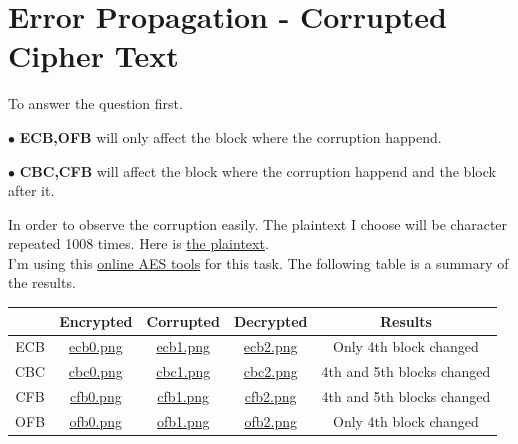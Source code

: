\documentclass{article}
\begin{document}
\section{Error Propagation - Corrupted Cipher Text}
To answer the question first.
\begin{tlist}{2}
	\item[$\bullet$]\textbf{ECB,OFB} will only affect the block where the corruption happend.
	\item[$\bullet$]\textbf{CBC,CFB} will affect the block where the corruption happend and the block after it.
\end{tlist}
In order to observe the corruption easily. The plaintext I choose will be character  repeated 1008 times. Here is
\href{https://i.loli.net/2018/09/27/5bac19f92ebad.png}{the plaintext}.\\
I'm using this \href{http://aes.online-domain-tools.com/}{online AES tools} for this task. The following table is a summary of the results.
\begin{center}
	\begin{tabular}{|c|c|c|c|c|}
		\hline
		                                                                 &
		Encrypted                                                        &
		Corrupted                                                        &
		Decrypted                                                        &
		Results                                                            \\\hline
		ECB                                                              &
		\href{https://i.loli.net/2018/09/27/5bac1a285802c.png}{ecb0.png} &
		\href{https://i.loli.net/2018/09/27/5bac1a285a250.png}{ecb1.png} &
		\href{https://i.loli.net/2018/09/27/5bac1a284fdca.png}{ecb2.png} &
		Only 4th block changed                                             \\\hline
		CBC                                                              &
		\href{https://i.loli.net/2018/09/27/5bac1a94a998c.png}{cbc0.png} &
		\href{https://i.loli.net/2018/09/27/5bac1a94abb6c.png}{cbc1.png} &
		\href{https://i.loli.net/2018/09/27/5bac1d5bbd4c5.png}{cbc2.png} &
		4th and 5th blocks changed                                         \\\hline
		CFB                                                              &
		\href{https://i.loli.net/2018/09/27/5bac1a94adccb.png}{cfb0.png} &
		\href{https://i.loli.net/2018/09/27/5bac1a94e6892.png}{cfb1.png} &
		\href{https://i.loli.net/2018/09/27/5bac1a94a3609.png}{cfb2.png} &
		4th and 5th blocks changed                                         \\\hline
		OFB                                                              &
		\href{https://i.loli.net/2018/09/27/5bac1a94e4a51.png}{ofb0.png} &
		\href{https://i.loli.net/2018/09/27/5bac1a94e2d20.png}{ofb1.png} &
		\href{https://i.loli.net/2018/09/27/5bac1a94d97a0.png}{ofb2.png} &
		Only 4th block changed                                             \\\hline
	\end{tabular}
\end{center}
\end{document}
